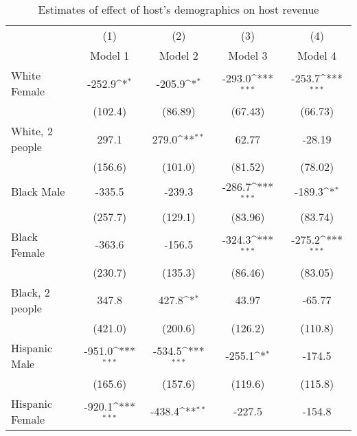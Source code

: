 {
\def\sym#1{\ifmmode^{#1}\else\(^{#1}\)\fi}
\begin{longtable}{l*{4}{c}}
\caption{Estimates of effect of host's demographics on host revenue}\\
\hline\hline\endfirsthead\hline\endhead\hline\endfoot\endlastfoot
                    &\multicolumn{1}{c}{(1)}&\multicolumn{1}{c}{(2)}&\multicolumn{1}{c}{(3)}&\multicolumn{1}{c}{(4)}\\
                    &\multicolumn{1}{c}{Model 1}&\multicolumn{1}{c}{Model 2}&\multicolumn{1}{c}{Model 3}&\multicolumn{1}{c}{Model 4}\\
\hline

White Female        &      -252.9\sym{*}  &      -205.9\sym{*}  &      -293.0\sym{***}&      -253.7\sym{***}\\
                    &     (102.4)         &     (86.89)         &     (67.43)         &     (66.73)         \\
[1em]
White, 2 people    &       297.1         &       279.0\sym{**} &       62.77         &      -28.19         \\
                    &     (156.6)         &     (101.0)         &     (81.52)         &     (78.02)         \\
[1em]
Black Male          &      -335.5         &      -239.3         &      -286.7\sym{***}&      -189.3\sym{*}  \\
                    &     (257.7)         &     (129.1)         &     (83.96)         &     (83.74)         \\
[1em]
Black Female        &      -363.6         &      -156.5         &      -324.3\sym{***}&      -275.2\sym{***}\\
                    &     (230.7)         &     (135.3)         &     (86.46)         &     (83.05)         \\
[1em]
Black, 2 people    &       347.8         &       427.8\sym{*}  &       43.97         &      -65.77         \\
                    &     (421.0)         &     (200.6)         &     (126.2)         &     (110.8)         \\
[1em]
Hispanic Male       &      -951.0\sym{***}&      -534.5\sym{***}&      -255.1\sym{*}  &      -174.5         \\
                    &     (165.6)         &     (157.6)         &     (119.6)         &     (115.8)         \\
[1em]
Hispanic Female     &      -920.1\sym{***}&      -438.4\sym{**} &      -227.5         &      -154.8         \\

\end{longtable}}
